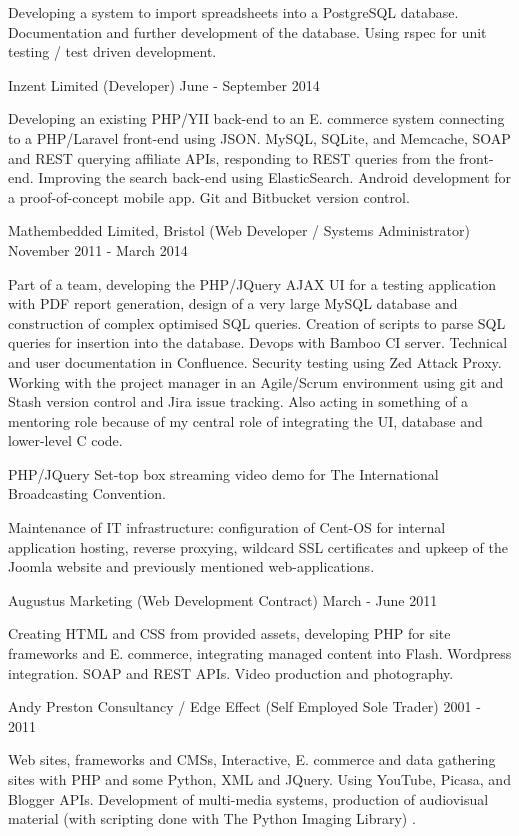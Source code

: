 Developing a 
system to import spreadsheets into a PostgreSQL database.
Documentation and further development of the database.
Using rspec for unit testing / test driven development.

\jobHeading
    {Inzent Limited (Developer)}
    {June - September 2014}

Developing an existing PHP/YII back-end to an
E. commerce system connecting to a PHP/Laravel front-end using JSON.
MySQL, SQLite, and Memcache, SOAP and REST querying affiliate APIs,
responding to REST queries from the front-end.
Improving the search back-end using ElasticSearch.
Android development for a proof-of-concept mobile app.
Git and Bitbucket version control.

\jobHeading
    {Mathembedded Limited, Bristol (Web Developer / Systems Administrator)}
    {November 2011 - March 2014}

Part of a team, developing the PHP/JQuery AJAX UI
for a testing application with PDF report generation,
design of a very large MySQL database
and construction of complex optimised SQL queries.
Creation of  scripts
to parse SQL queries for insertion into the database.
Devops with Bamboo CI server.
Technical and user documentation in Confluence.
Security testing using Zed Attack Proxy.
Working with the project manager in an Agile/Scrum environment
using git and Stash version control and Jira issue tracking.
Also acting in something of a mentoring role
because of my central role of integrating the UI,
database and lower-level C code.

PHP/JQuery Set-top box streaming video demo for
The International Broadcasting Convention.

Maintenance of IT infrastructure:
configuration of Cent-OS for internal application hosting,
reverse proxying, wildcard SSL certificates
and upkeep of the Joomla website
and previously mentioned web-applications.

\jobHeading
    {Augustus Marketing (Web Development Contract)}
    {March - June 2011}

Creating HTML and CSS from provided assets,
developing PHP for site frameworks and E. commerce,
integrating managed content into Flash.
Wordpress integration.
SOAP and REST APIs.
Video production and photography.

\jobHeading
    {Andy Preston Consultancy / Edge Effect (Self Employed Sole Trader)}
    {2001 - 2011}

Web sites, frameworks and CMSs, Interactive, E. commerce and
data gathering sites with PHP and some Python, XML and JQuery.
Using YouTube, Picasa, and Blogger APIs.
Development of multi-media systems, production of audiovisual
material\ifnum{}
    (with scripting done with The Python Imaging Library)
\fi.

